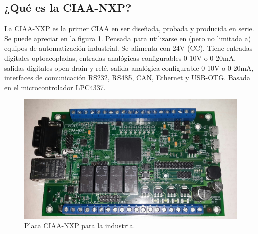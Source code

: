 \subsection{¿Qué es la CIAA-NXP?}

La CIAA-NXP es la primer CIAA en ser diseñada, probada y producida en serie. Se puede apreciar en la figura \ref{fig:ciaaxp}. Pensada para utilizarse en (pero no limitada a) equipos de automatización industrial. Se alimenta con 24V (CC). Tiene entradas digitales optoacopladas, entradas analógicas configurables 0-10V o 0-20mA, salidas digitales open-drain y relé, salida analógica configurable 0-10V o 0-20mA, interfaces de comunicación RS232, RS485, CAN, Ethernet y USB-OTG. Basada en el microcontrolador LPC4337. 

\begin{figure}[ht]
  \centering
  \includegraphics[scale=.2]{./Figures/ciaa.png}
  \caption{Placa CIAA-NXP para la industria.}
  \label{fig:ciaaxp}
\end{figure}

